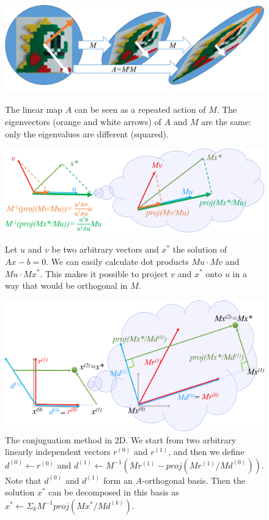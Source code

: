 \documentclass[notitlepage,oneside]{book}
\begin{document}
\begin{figure}[p]
\centering
  \includegraphics[width=1\linewidth]{cg/MMA.png}
  \caption{
The linear map $A$ can be seen as a repeated action of $M$.
The eigenvectors (orange and white arrows) of $A$ and $M$ are the same: only the eigenvalues are different (squared).}
  \label{fig:stretchM}

  \includegraphics[width=.8\linewidth]{cg/Aorth.png}
  \caption{Let $u$ and $v$ be two arbitrary vectors and $x^*$ the solution of $Ax-b=0$.
  We can easily calculate dot products $Mu\cdot Mv$ and $Mu\cdot Mx^*$.
  This makes it possible to project $v$ and $x^*$ onto $u$ in a way that would be orthogonal in $M$.}
  \label{fig:Aorth}

  \includegraphics[width=.7\linewidth]{cg/proj2D.png}
  \caption{The conjuguation method in 2D. We start from two arbitrary linearly independent vectors $r^{(0)}$ and $r^{(1)}$, and then we define $d^{(0)} \leftarrow r^{(0)}$
    and $d^{(1)} \leftarrow M^{-1}\left(Mr^{(1)}-proj\left(Mr^{(1)}/Md^{(0)}\right)\right)$. 
    Note that $d^{(0)}$ and $d^{(1)}$ form an $A$-orthogonal basis.
    Then the solution $x^*$ can be decomposed in this basis as
    $x^*\leftarrow \Sigma_k M^{-1}proj\left(Mx^*/Md^{(k)}\right)$.}
  \label{fig:proj2D}

\end{figure}
\end{document}
